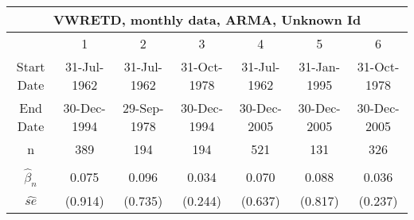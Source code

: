  \begin{table}[H] 
 \tiny 
 \centering 
\begin{tabular}{|c|c|c|c|c|c|c|} %
\multicolumn{7}{c}{ VWRETD, monthly data, ARMA, Unknown Id } \\ 
 \hline 
 &  1  &  2  &  3  &  4  &  5  &  6  \\ %
 \hline 
 Start Date &  31-Jul-1962 &  31-Jul-1962 &  31-Oct-1978 &  31-Jul-1962 &  31-Jan-1995 &  31-Oct-1978  \\ %
 End Date &  30-Dec-1994 &  29-Sep-1978 &  30-Dec-1994 &  30-Dec-2005 &  30-Dec-2005 &  30-Dec-2005  \\ %
 n &   389  &   194  &   194  &   521  &   131  &   326   \\ %
 \hline
 \hline
  &     &     &     &     &     &      \\ %
 $\hat{\beta}_{n}$ &  0.075 &  0.096 &  0.034 &  0.070 &  0.088 &  0.036  \\ %
 $\hat{se}$ &  (0.914) &  (0.735) &  (0.244) &  (0.637) &  (0.817) &  (0.237)  \\ %
 \hline 
\end{tabular}
 \end{table}
